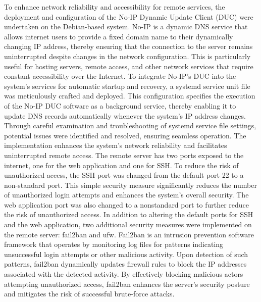 \documentclass[12pt]{article} %
\begin{document}
\newline
\newline
\noindent To enhance network reliability and accessibility for remote services, the deployment and configuration of the No-IP Dynamic Update Client (DUC) were undertaken on the Debian-based system. No-IP is a dynamic DNS service that allows internet users to provide a fixed domain name to their dynamically changing IP address, thereby ensuring that the connection to the server remains uninterrupted despite changes in the network configuration. This is particularly useful for hosting servers, remote access, and other network services that require constant accessibility over the Internet. To integrate No-IP's DUC into the system's services for automatic startup and recovery, a systemd service unit file was meticulously crafted and deployed. This configuration specifies the execution of the No-IP DUC software as a background service, thereby enabling it to update DNS records automatically whenever the system's IP address changes. Through careful examination and troubleshooting of systemd service file settings, potential issues were identified and resolved, ensuring seamless operation. The implementation enhances the system's network reliability and facilitates uninterrupted remote access.
\newline
\newline
\noindent The remote server has two ports exposed to the internet, one for the web application and one for SSH. To reduce the risk of unauthorized access, the SSH port was changed from the default port 22 to a non-standard port. This simple security measure significantly reduces the number of unauthorized login attempts and enhances the system's overall security. The web application port was also changed to a nonstandard port to further reduce the risk of unauthorized access. In addition to altering the default ports for SSH and the web application, two additional security measures were implemented on the remote server: fail2ban and ufw.
\newline
\newline
\noindent Fail2ban is an intrusion prevention software framework that operates by monitoring log files for patterns indicating unsuccessful login attempts or other malicious activity. Upon detection of such patterns, fail2ban dynamically updates firewall rules to block the IP addresses associated with the detected activity. By effectively blocking malicious actors attempting unauthorized access, fail2ban enhances the server's security posture and mitigates the risk of successful brute-force attacks.
\end{document}
